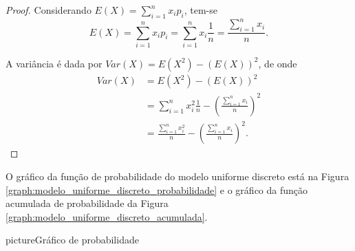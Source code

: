 \begin{proof}
	Considerando $E(X)=\displaystyle\sum_{i=1}^{n}x_i p_i$, tem-se
	\[
		E(X)=\sum_{i=1}^{n}x_i p_i =\sum_{i=1}^{n} x_i\frac{1}{n} = \frac{\displaystyle\sum_{i=1}^{n} x_i}{n}\text{.}
	\]

	A variância é dada por $Var(X)=E(X^2)-(E(X))^2$, de onde
	\begin{align*}
		Var(X) &= E(X^2)-(E(X))^2\\
			   &= \sum_{i=1}^{n} x_i^2\frac{1}{n} - \left ( \frac{\sum_{i=1}^{n} x_i}{n} \right)^2\\
			   &= \frac{\displaystyle\sum_{i=1}^{n}x_i^2}{n} - \left ( \frac{ \sum_{i=1}^{n}x_i}{n} \right)^2\text{.}
	\end{align*}
\end{proof}

O gráfico da função de probabilidade do modelo uniforme discreto está na Figura \ref{graph:modelo_uniforme_discreto_probabilidade} e o gráfico da função acumulada de probabilidade da Figura \ref{graph:modelo_uniforme_discreto_acumulada}.

\begin{sidepicture}{10cm}{picture}{Gráfico de probabilidade}
	\label{graph:modelo_uniforme_discreto_probabilidade}
	\centering
\end{sidepicture}

